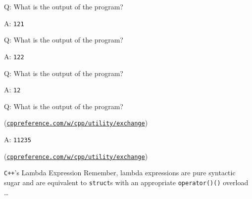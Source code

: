 \begin{frame}[fragile]{Q: What is the output of the program?}
\end{frame}

\begin{frame}[fragile]{A: \texttt{121}}
\end{frame}

\begin{frame}[fragile]{Q: What is the output of the program?}
\end{frame}

\begin{frame}[fragile]{A: \texttt{122}}
\end{frame}

\begin{frame}[fragile]{Q: What is the output of the program?}
\end{frame}

\begin{frame}[fragile]{A: \texttt{12}}
\end{frame}

\begin{frame}[fragile]{Q: What is the output of the program?}

    \begin{center}
        (\href{https://en.cppreference.com/w/cpp/utility/exchange}{\texttt{cppreference.com/w/cpp/utility/exchange}})
    \end{center}
\end{frame}

\begin{frame}[fragile]{A: \texttt{11235}}

    \begin{center}
        (\href{https://en.cppreference.com/w/cpp/utility/exchange}{\texttt{cppreference.com/w/cpp/utility/exchange}})
    \end{center}
\end{frame}

\begin{frame}{\texttt{C++}'s Lambda Expression}
    Remember, lambda expressions are pure syntactic sugar and are equivalent to \texttt{struct}s with an appropriate \texttt{operator()()} overload \ldots
\end{frame}

